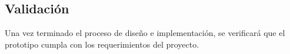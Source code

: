 \subsection{Validación}
Una vez terminado el proceso de diseño e implementación,
se verificará que el prototipo cumpla con los requerimientos del proyecto.







